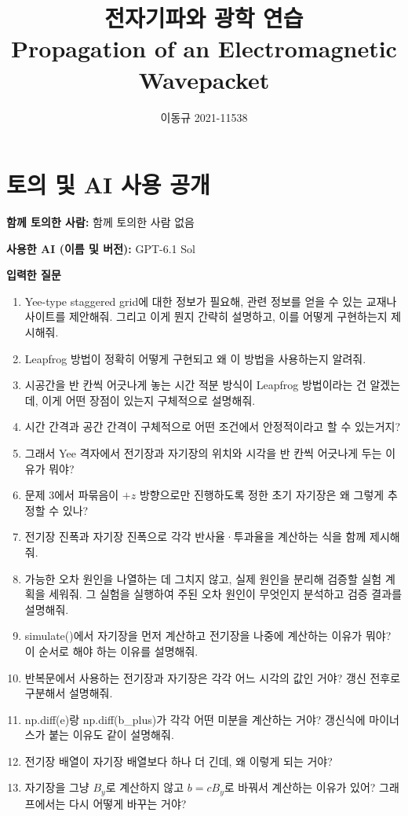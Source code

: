 \documentclass[11pt,a4paper]{article}
\title{\huge\textbf{전자기파와 광학 연습}\\[0.5em]
 \large Propagation of an Electromagnetic Wavepacket}
\author{이동규 2021-11538}
\date{}
\begin{document}
\maketitle
\section{토의 및 AI 사용 공개}
\noindent\textbf{함께 토의한 사람:} 함께 토의한 사람 없음\par
\noindent\textbf{사용한 AI (이름 및 버전):} GPT-6.1 Sol\par
\noindent\textbf{입력한 질문}\par
\begin{enumerate}[label=\arabic*.,leftmargin=1.8em,itemsep=0.35em,topsep=0.4em]
\item Yee-type staggered grid에 대한 정보가 필요해, 관련 정보를 얻을 수 있는 교재나 사이트를 제안해줘. 그리고 이게 뭔지 간략히 설명하고, 이를 어떻게 구현하는지 제시해줘.
\item Leapfrog 방법이 정확히 어떻게 구현되고 왜 이 방법을 사용하는지 알려줘. 
\item 시공간을 반 칸씩 어긋나게 놓는 시간 적분 방식이 Leapfrog 방법이라는 건 알겠는데, 이게 어떤 장점이 있는지 구체적으로 설명해줘.
\item 시간 간격과 공간 간격이 구체적으로 어떤 조건에서 안정적이라고 할 수 있는거지?
\item 그래서 Yee 격자에서 전기장과 자기장의 위치와 시각을 반 칸씩 어긋나게 두는 이유가 뭐야?
\item 문제 3에서 파묶음이 $+z$ 방향으로만 진행하도록 정한 초기 자기장은 왜 그렇게 추정할 수 있나?
\item 전기장 진폭과 자기장 진폭으로 각각 반사율·투과율을 계산하는 식을 함께 제시해줘.
\item 가능한 오차 원인을 나열하는 데 그치지 않고, 실제 원인을 분리해 검증할 실험 계획을 세워줘. 그 실험을 실행하여 주된 오차 원인이 무엇인지 분석하고 검증 결과를 설명해줘.
\item simulate()에서 자기장을 먼저 계산하고 전기장을 나중에 계산하는 이유가 뭐야? 이 순서로 해야 하는 이유를 설명해줘.
\item 반복문에서 사용하는 전기장과 자기장은 각각 어느 시각의 값인 거야? 갱신 전후로 구분해서 설명해줘.
\item np.diff(e)랑 np.diff(b_plus)가 각각 어떤 미분을 계산하는 거야? 갱신식에 마이너스가 붙는 이유도 같이 설명해줘.
\item 전기장 배열이 자기장 배열보다 하나 더 긴데, 왜 이렇게 되는 거야?
\item 자기장을 그냥 \(B_y\)로 계산하지 않고 \(b=cB_y\)로 바꿔서 계산하는 이유가 있어? 그래프에서는 다시 어떻게 바꾸는 거야?

\end{enumerate}
\end{document}

